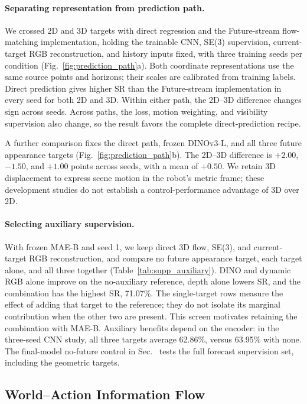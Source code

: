 \paragraph{Separating representation from prediction path.}
We crossed 2D and 3D targets with direct regression and the Future-stream
flow-matching implementation, holding the trainable CNN, SE(3) supervision,
current-target RGB reconstruction, and history inputs fixed, with three training
seeds per condition (Fig.~\ref{fig:prediction_path}a). Both coordinate
representations use the same source points and horizons; their scales are
calibrated from training labels. Direct prediction gives higher SR than the
Future-stream implementation in every seed for both 2D and 3D. Within either
path, the 2D--3D difference changes sign across seeds. Across paths, the loss,
motion weighting, and visibility supervision also change, so the result favors
the complete direct-prediction recipe.

A further comparison fixes the direct path, frozen DINOv3-L, and all three future
appearance targets (Fig.~\ref{fig:prediction_path}b). The 2D--3D difference is
$+2.00$, $-1.50$, and $+1.00$ points across seeds, with a mean of $+0.50$.
We retain 3D displacement to express scene motion in the robot's metric frame;
these development studies do not establish a control-performance advantage of 3D
over 2D.


\paragraph{Selecting auxiliary supervision.}
With frozen MAE-B and seed 1, we keep direct 3D flow, SE(3), and current-target RGB
reconstruction, and compare no future appearance target, each target alone, and
all three together (Table~\ref{tab:supp_auxiliary}). DINO and dynamic RGB alone
improve on the no-auxiliary reference, depth alone lowers SR, and the combination
has the highest SR, 71.07\%. The single-target rows measure the effect of adding
that target to the reference; they do not isolate its marginal contribution when
the other two are present. This screen motivates retaining the combination with
MAE-B. Auxiliary benefits depend on the encoder: in the three-seed CNN study,
all three targets average 62.86\%, versus 63.95\% with none. The final-model
no-future control in Sec.~ tests the full forecast
supervision set, including the geometric targets.

\subsection{World--Action Information Flow}
\label{app:design_act}


